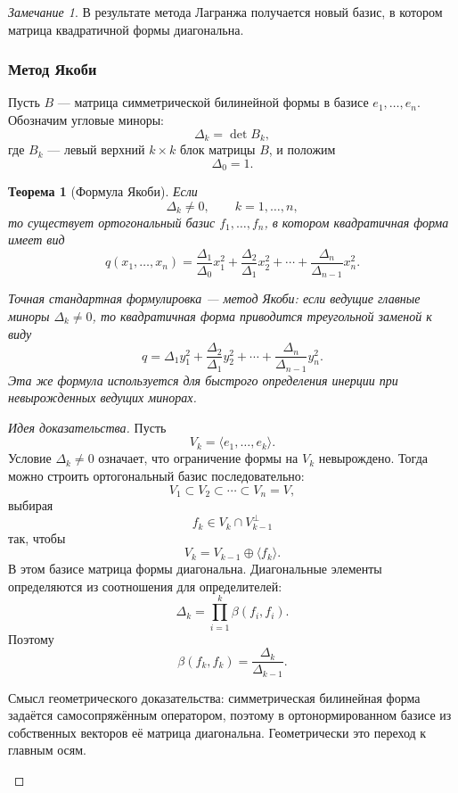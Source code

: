 \documentclass[12pt,a4paper]{article}
\theoremstyle{definition}
\theoremstyle{plain}
\newtheorem{theorem}[definition]{Теорема}
\theoremstyle{remark}
\newtheorem{remark}[definition]{Замечание}
\newenvironment{knowledgefix}{\begin{clarifybox}}{\end{clarifybox}}
\begin{document}
\begin{remark}
В результате метода Лагранжа получается новый базис, в котором матрица квадратичной формы диагональна.
\end{remark}

\subsubsection*{Метод Якоби}

Пусть $B$ --- матрица симметрической билинейной формы в базисе $e_1,\ldots,e_n$.
Обозначим угловые миноры:
\[
    \Delta_k=\det B_k,
\]
где $B_k$ --- левый верхний $k\times k$ блок матрицы $B$, и положим
\[
    \Delta_0=1.
\]

\begin{theorem}[Формула Якоби]
Если
\[
    \Delta_k\ne0,
    \qquad k=1,\ldots,n,
\]
то существует ортогональный базис $f_1,\ldots,f_n$, в котором квадратичная форма имеет вид
\[
    q(x_1,\ldots,x_n)
    =\frac{\Delta_1}{\Delta_0}x_1^2
    +\frac{\Delta_2}{\Delta_1}x_2^2
    +\cdots+
    \frac{\Delta_n}{\Delta_{n-1}}x_n^2.
\]
\begin{knowledgefix}
Точная стандартная формулировка — метод Якоби: если ведущие главные миноры \(\Delta_k\ne0\), то квадратичная форма приводится треугольной заменой к виду
\[q=\Delta_1 y_1^2+\frac{\Delta_2}{\Delta_1}y_2^2+\cdots+\frac{\Delta_n}{\Delta_{n-1}}y_n^2.\]
Эта же формула используется для быстрого определения инерции при невырожденных ведущих минорах.
\end{knowledgefix}
\end{theorem}

\begin{proof}[Идея доказательства]
Пусть
\[
    V_k=\langle e_1,\ldots,e_k\rangle.
\]
Условие $\Delta_k\ne0$ означает, что ограничение формы на $V_k$ невырождено.
Тогда можно строить ортогональный базис последовательно:
\[
    V_1\subset V_2\subset\cdots\subset V_n=V,
\]
выбирая
\[
    f_k\in V_k\cap V_{k-1}^{\perp}
\]
так, чтобы
\[
    V_k=V_{k-1}\oplus\langle f_k\rangle.
\]
В этом базисе матрица формы диагональна.
Диагональные элементы определяются из соотношения для определителей:
\[
    \Delta_k=\prod_{i=1}^k \beta(f_i,f_i).
\]
Поэтому
\[
    \beta(f_k,f_k)=\frac{\Delta_k}{\Delta_{k-1}}.
\]
\begin{knowledgefix}
Смысл геометрического доказательства: симметрическая билинейная форма задаётся самосопряжённым оператором, поэтому в ортонормированном базисе из собственных векторов её матрица диагональна. Геометрически это переход к главным осям.
\end{knowledgefix}
\end{proof}
\end{document}
